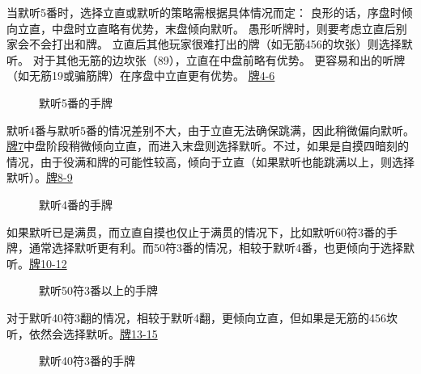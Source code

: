 当默听5番时，选择立直或默听的策略需根据具体情况而定：
良形的话，序盘时倾向立直，中盘时立直略有优势，末盘倾向默听。
愚形听牌时，则要考虑立直后别家会不会打出和牌。
立直后其他玩家很难打出的牌（如无筋456的坎张）则选择默听。
对于其他无筋的边坎张（89），立直在中盘前略有优势。
更容易和出的听牌（如无筋19或骗筋牌）在序盘中立直更有优势。
\hyperref[lec2:pai4-6]{牌4-6}

\begin{figure}[h]
    \caption{默听5番的手牌}
    \label{lec2:pai4-6}
    \par\bigskip
    \par\bigskip
\end{figure}


默听4番与默听5番的情况差别不大，由于立直无法确保跳满，因此稍微偏向默听。
\hyperref[lec2:pai7-9]{牌7}中盘阶段稍微倾向立直，而进入末盘则选择默听。不过，如果是自摸四暗刻的情况，由于役满和牌的可能性较高，倾向于立直（如果默听也能跳满以上，则选择默听）。\hyperref[lec2:pai7-9]{牌8-9}
\begin{figure}[h]
    \caption{默听4番的手牌}
    \label{lec2:pai7-9}
    \par\bigskip
    \par\bigskip
\end{figure}

如果默听已是满贯，而立直自摸也仅止于满贯的情况下，比如默听60符3番的手牌，通常选择默听更有利。而50符3番的情况，相较于默听4番，也更倾向于选择默听。\hyperref[lec2:pai10-12]{牌10-12}
\begin{figure}[h]
    \caption{默听50符3番以上的手牌}
    \label{lec2:pai10-12}
    \par\bigskip
    \par\bigskip
\end{figure}

对于默听40符3翻的情况，相较于默听4翻，更倾向立直，但如果是无筋的456坎听，依然会选择默听。\hyperref[lec2:pai13-15]{牌13-15}

\begin{figure}[h]
    \caption{默听40符3番的手牌}
    \label{lec2:pai13-15}
    \par\bigskip
    \par\bigskip
\end{figure}

